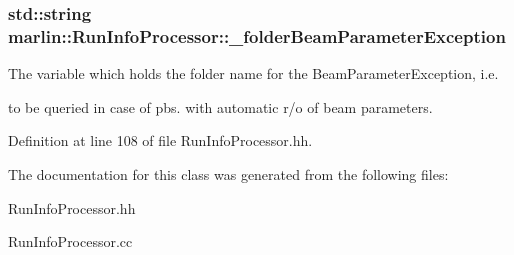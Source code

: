 \subsubsection[{\-\_\-folder\-Beam\-Parameter\-Exception}]{\setlength{\rightskip}{0pt plus 5cm}std\-::string marlin\-::\-Run\-Info\-Processor\-::\-\_\-folder\-Beam\-Parameter\-Exception\hspace{0.3cm}{\ttfamily [private]}}\label{classmarlin_1_1RunInfoProcessor_a36e4d01591a54d222092bd583b231f56}


The variable which holds the folder name for the Beam\-Parameter\-Exception, i.\-e. 

to be queried in case of pbs. with automatic r/o of beam parameters. 

Definition at line 108 of file Run\-Info\-Processor.\-hh.



The documentation for this class was generated from the following files\-:\begin{DoxyCompactItemize}
\item 
Run\-Info\-Processor.\-hh\item 
Run\-Info\-Processor.\-cc\end{DoxyCompactItemize}
